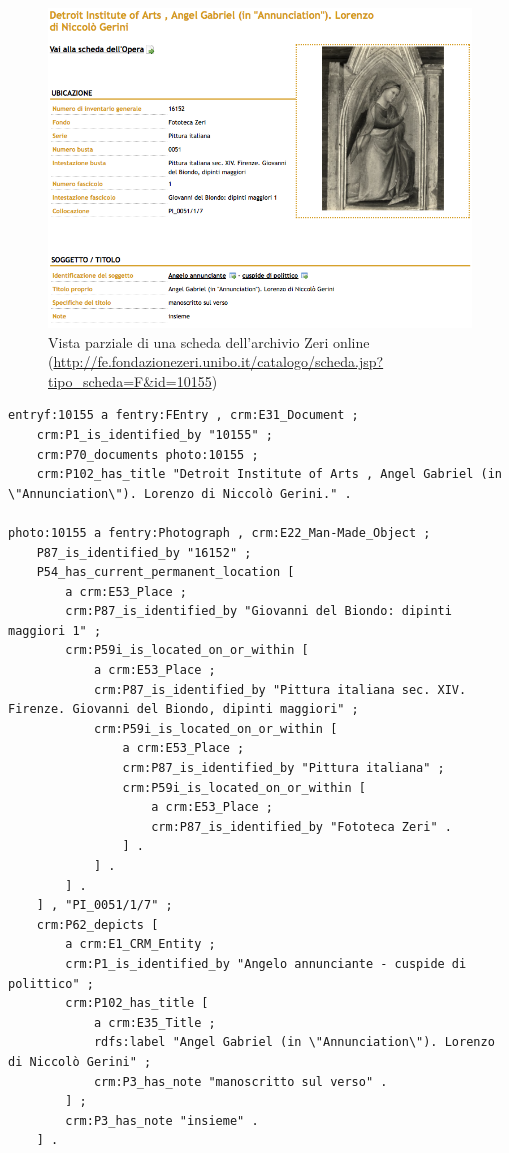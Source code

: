 \begin{figure}
    \centering
    \includegraphics[width=\textwidth]{images/angelo-annunziante.png}
	\caption{Vista parziale di una scheda dell'archivio Zeri online (\protect\url{http://fe.fondazionezeri.unibo.it/catalogo/scheda.jsp?tipo_scheda=F&id=10155})}\label{fig:angelo-annunziante}
\end{figure}

\begin{noindent}
\begin{minipage}{\linewidth}
\begin{lstlisting}[caption=Esempio ideale di conversione, label=listing:conversion-example]
entryf:10155 a fentry:FEntry , crm:E31_Document ;
	crm:P1_is_identified_by "10155" ;
	crm:P70_documents photo:10155 ;
	crm:P102_has_title "Detroit Institute of Arts , Angel Gabriel (in \"Annunciation\"). Lorenzo di Niccolò Gerini." .

photo:10155 a fentry:Photograph , crm:E22_Man-Made_Object ;
	P87_is_identified_by "16152" ;
	P54_has_current_permanent_location [
		a crm:E53_Place ;
		crm:P87_is_identified_by "Giovanni del Biondo: dipinti maggiori 1" ;
		crm:P59i_is_located_on_or_within [
			a crm:E53_Place ;
			crm:P87_is_identified_by "Pittura italiana sec. XIV. Firenze. Giovanni del Biondo, dipinti maggiori" ;
			crm:P59i_is_located_on_or_within [
				a crm:E53_Place ;
				crm:P87_is_identified_by "Pittura italiana" ;
				crm:P59i_is_located_on_or_within [
					a crm:E53_Place ;
					crm:P87_is_identified_by "Fototeca Zeri" .
				] .
			] .
		] .
	] , "PI_0051/1/7" ;
	crm:P62_depicts [
		a crm:E1_CRM_Entity ;
		crm:P1_is_identified_by "Angelo annunciante - cuspide di polittico" ;
		crm:P102_has_title [
			a crm:E35_Title ;
			rdfs:label "Angel Gabriel (in \"Annunciation\"). Lorenzo di Niccolò Gerini" ;
			crm:P3_has_note "manoscritto sul verso" .
		] ;
		crm:P3_has_note "insieme" .
	] .
\end{lstlisting}
\end{minipage}
\end{noindent}

